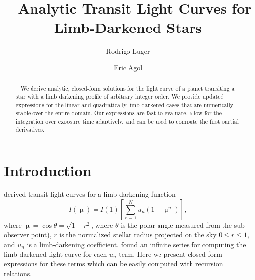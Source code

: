 \documentclass[modern]{aastex61}
\begin{document}

\setlength{\abovedisplayskip}{1.5em}
\setlength{\belowdisplayskip}{1.5em}

\title{%
    Analytic Transit Light Curves for Limb-Darkened Stars
}

\author[0000-0002-0296-3826]{Rodrigo Luger}
\author{Eric Agol}


\begin{abstract}
    We derive analytic, closed-form solutions for the light curve
    of a planet transiting a star with a limb darkening profile of
    arbitrary integer order.  We provide updated expressions for the linear
    and quadratically limb darkened cases that are numerically stable
    over the entire domain.  Our expressions are fast to evaluate,
    allow for the integration over exposure time adaptively, and
    can be used to compute the first partial derivatives.
\end{abstract}

%
\section{Introduction}
\label{sec:intro}

\citet{Gimenez2006} derived transit light curves for a limb-darkening
function
\begin{equation}
I(\upmu) = I(1) \left[\sum_{n=1}^N u_n (1-\upmu^n) \right],
\end{equation}
where $\upmu = \cos{\theta} =\sqrt{1-r^2}$, where $\theta$ is the polar angle measured from the
sub-observer point), $r$ is the normalized stellar radius projected on the sky
$0\le r \le 1$, and $u_n$ is a limb-darkening coefficient.  \cite{Gimenez2006}
found an infinite series for computing the limb-darkened light curve for each $u_n$
term.  Here we present closed-form expressions for these terms which can be
easily computed with recursion relations.
\end{document}
